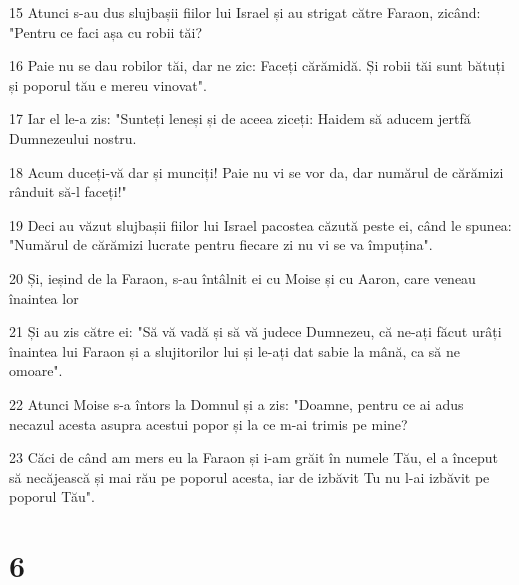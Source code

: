 \par 15 Atunci s-au dus slujbașii fiilor lui Israel și au strigat către Faraon, zicând: "Pentru ce faci așa cu robii tăi?
\par 16 Paie nu se dau robilor tăi, dar ne zic: Faceți cărămidă. Și robii tăi sunt bătuți și poporul tău e mereu vinovat".
\par 17 Iar el le-a zis: "Sunteți leneși și de aceea ziceți: Haidem să aducem jertfă Dumnezeului nostru.
\par 18 Acum duceți-vă dar și munciți! Paie nu vi se vor da, dar numărul de cărămizi rânduit să-l faceți!"
\par 19 Deci au văzut slujbașii fiilor lui Israel pacostea căzută peste ei, când le spunea: "Numărul de cărămizi lucrate pentru fiecare zi nu vi se va împuțina".
\par 20 Și, ieșind de la Faraon, s-au întâlnit ei cu Moise și cu Aaron, care veneau înaintea lor
\par 21 Și au zis către ei: "Să vă vadă și să vă judece Dumnezeu, că ne-ați făcut urâți înaintea lui Faraon și a slujitorilor lui și le-ați dat sabie la mână, ca să ne omoare".
\par 22 Atunci Moise s-a întors la Domnul și a zis: "Doamne, pentru ce ai adus necazul acesta asupra acestui popor și la ce m-ai trimis pe mine?
\par 23 Căci de când am mers eu la Faraon și i-am grăit în numele Tău, el a început să necăjească și mai rău pe poporul acesta, iar de izbăvit Tu nu l-ai izbăvit pe poporul Tău".

\chapter{6}

